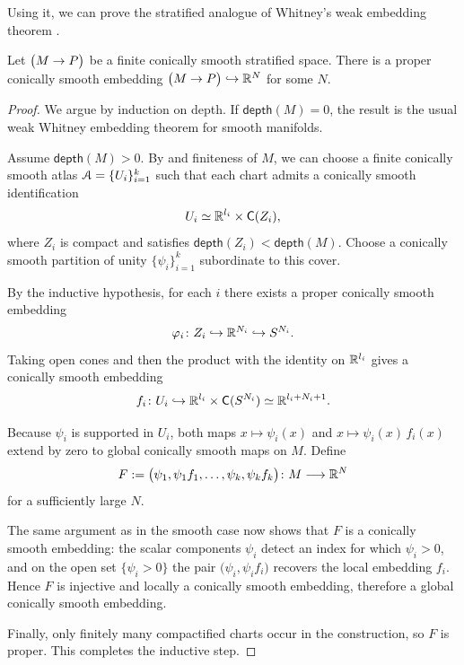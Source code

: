 Using it, we can prove the stratified analogue of Whitney's weak embedding theorem .

\begin{proposition}\label{ch4:: prop: weak Whit strat}
    Let $\big(M \rightarrow P\big)$ be a finite conically smooth stratified space. There is a proper conically smooth embedding $\big(M \rightarrow P\big) \hookrightarrow \mathbb R^{N}$ for some $N$. 
\end{proposition}
\begin{proof}
    We argue by induction on depth. If $\mathsf{depth}(M)=0$, the result is the usual weak Whitney embedding theorem for smooth manifolds.

    Assume $\mathsf{depth}(M)>0$. By  and finiteness of $M$, we can choose a finite conically smooth atlas $\mathcal A=\{U_i\}_{i=1}^{k}$ such that each chart admits a conically smooth identification
    \begin{equation}
        U_i \simeq \mathbb R^{l_i}\times \mathsf C(Z_i),
    \end{equation}
    where $Z_i$ is compact and satisfies $\mathsf{depth}(Z_i)<\mathsf{depth}(M)$. Choose a conically smooth partition of unity $\{\psi_i\}_{i=1}^{k}$ subordinate to this cover.

    By the inductive hypothesis, for each $i$ there exists a proper conically smooth embedding
    \begin{equation}
        \varphi_i \colon Z_i \hookrightarrow \mathbb R^{N_i} \hookrightarrow S^{N_i}.
    \end{equation}
    Taking open cones and then the product with the identity on $\mathbb R^{l_i}$ gives a conically smooth embedding
    \begin{equation}
        f_i \colon U_i \hookrightarrow \mathbb R^{l_i}\times \mathsf C(S^{N_i}) \simeq \mathbb R^{l_i+N_i+1}.
    \end{equation}

    Because $\psi_i$ is supported in $U_i$, both maps $x\mapsto \psi_i(x)$ and $x\mapsto \psi_i(x)\,f_i(x)$ extend by zero to global conically smooth maps on $M$. Define
    \begin{equation}
        F := \big(\psi_1,\psi_1f_1,\ldots,\psi_k,\psi_kf_k\big)\colon M \longrightarrow \mathbb R^{N}
    \end{equation}
    for a sufficiently large $N$.

    The same argument as in the smooth case now shows that $F$ is a conically smooth embedding: the scalar components $\psi_i$ detect an index for which $\psi_i>0$, and on the open set $\{\psi_i>0\}$ the pair $\big(\psi_i,\psi_i f_i\big)$ recovers the local embedding $f_i$. Hence $F$ is injective and locally a conically smooth embedding, therefore a global conically smooth embedding.

    Finally, only finitely many compactified charts occur in the construction, so $F$ is proper. This completes the inductive step.
\end{proof}

